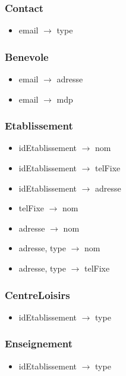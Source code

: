 \subsubsection*{Contact}
\begin{itemize}
\item[] email $\rightarrow$ type 
\end{itemize}

\subsubsection*{Benevole}
\begin{itemize}
\item[] email $\rightarrow$ adresse 
\item[] email $\rightarrow$ mdp 
\end{itemize}


\subsubsection*{Etablissement}
\begin{itemize}
\item[] idEtablissement $\rightarrow$ nom 
\item[] idEtablissement $\rightarrow$ telFixe
\item[] idEtablissement $\rightarrow$ adresse
\item[] telFixe $\rightarrow$ nom
\item[] adresse $\rightarrow$ nom
\item[] adresse, type $\rightarrow$ nom
\item[] adresse, type $\rightarrow$ telFixe
\end{itemize}

\subsubsection*{CentreLoisirs}
\begin{itemize}
\item[]	idEtablissement $\rightarrow$ type
\end{itemize}

\subsubsection*{Enseignement}
\begin{itemize}
\item[]	idEtablissement $\rightarrow$ type
\end{itemize}

